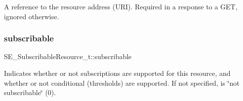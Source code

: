 A reference to the resource address (U\+RI). Required in a response to a G\+ET, ignored otherwise. \mbox{\label{group__SubscribableResource_gae36176e6f5160dca220b2e8047cdc241}} 
\subsubsection{\texorpdfstring{subscribable}{subscribable}}
{\footnotesize\ttfamily S\+E\+\_\+\+Subscribable\+Resource\+\_\+t\+::subscribable}

Indicates whether or not subscriptions are supported for this resource, and whether or not conditional (thresholds) are supported. If not specified, is \char`\"{}not subscribable\char`\"{} (0). 